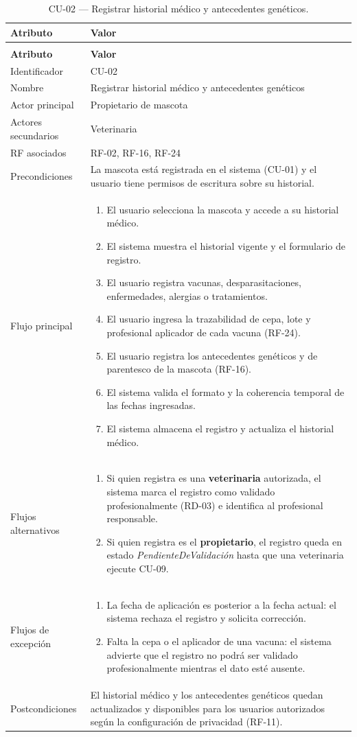 \documentclass[journal,onecolumn]{IEEEtran}
\makeatletter
\newenvironment{atributos}[2]{%
	\small
	\begin{longtable}{@{}>{\raggedright\arraybackslash}p{4.2cm} >{\raggedright\arraybackslash}p{11.2cm}@{}}
		\caption{#2}\label{tab:#1}\\
		\toprule
		\textbf{Atributo} & \textbf{Valor} \\
		\midrule
		\endfirsthead
		\multicolumn{2}{@{}l}{\small\itshape (continuación)}\\
		\toprule
		\textbf{Atributo} & \textbf{Valor} \\
		\midrule
		\endhead
		\bottomrule
		\endlastfoot
	}{%
	\end{longtable}
	\normalsize
}
\makeatother
\begin{document}
	\begin{atributos}{CU-02}{CU-02 --- Registrar historial médico y antecedentes genéticos.}
		Identificador & CU-02 \\
		Nombre & Registrar historial médico y antecedentes genéticos \\
		Actor principal & Propietario de mascota \\
		Actores secundarios & Veterinaria \\
		RF asociados & RF-02, RF-16, RF-24 \\
		Precondiciones & La mascota está registrada en el sistema (CU-01) y el usuario tiene permisos de escritura sobre su historial. \\
		Flujo principal &
		\begin{enumerate}[leftmargin=*, nosep]
			\item El usuario selecciona la mascota y accede a su historial médico.
			\item El sistema muestra el historial vigente y el formulario de registro.
			\item El usuario registra vacunas, desparasitaciones, enfermedades, alergias o tratamientos.
			\item El usuario ingresa la trazabilidad de cepa, lote y profesional aplicador de cada vacuna (RF-24).
			\item El usuario registra los antecedentes genéticos y de parentesco de la mascota (RF-16).
			\item El sistema valida el formato y la coherencia temporal de las fechas ingresadas.
			\item El sistema almacena el registro y actualiza el historial médico.
		\end{enumerate} \\
		Flujos alternativos &
		\begin{enumerate}[leftmargin=*, nosep]
			\item[7.1] Si quien registra es una \textbf{veterinaria} autorizada, el sistema marca el registro como validado profesionalmente (RD-03) e identifica al profesional responsable.
			\item[7.2] Si quien registra es el \textbf{propietario}, el registro queda en estado \emph{PendienteDeValidación} hasta que una veterinaria ejecute CU-09.
		\end{enumerate} \\
		Flujos de excepción &
		\begin{enumerate}[leftmargin=*, nosep]
			\item[6.1] La fecha de aplicación es posterior a la fecha actual: el sistema rechaza el registro y solicita corrección.
			\item[6.2] Falta la cepa o el aplicador de una vacuna: el sistema advierte que el registro no podrá ser validado profesionalmente mientras el dato esté ausente.
		\end{enumerate} \\
		Postcondiciones & El historial médico y los antecedentes genéticos quedan actualizados y disponibles para los usuarios autorizados según la configuración de privacidad (RF-11). \\
	\end{atributos}
	
\end{document}
